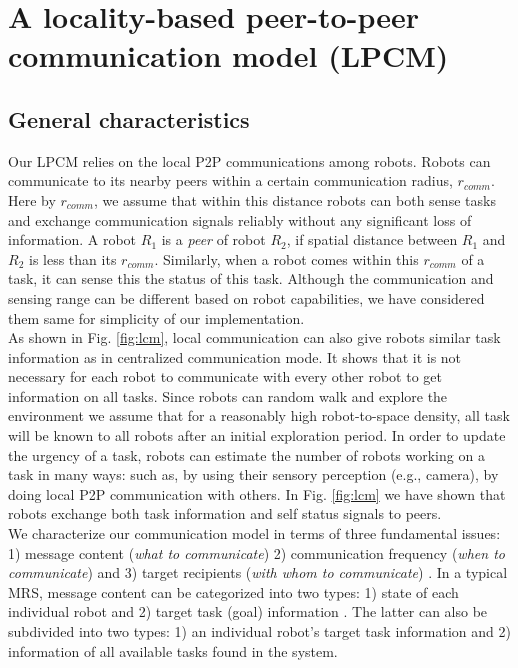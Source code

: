 \section{A locality-based peer-to-peer communication model (LPCM)}
\label{local-comm:model}
\subsection{General characteristics}
Our LPCM relies on the local P2P communications among robots. Robots can communicate to its nearby peers within a certain communication radius, $r_{comm}$. Here by $r_{comm}$, we assume that within this distance robots can both sense tasks and exchange communication signals reliably without any significant loss of information. A robot $R_1$ is a {\em peer} of robot $R_2$, if spatial distance between $R_1$ and $R_2$ is less than its $r_{comm}$.
Similarly, when a robot comes within this $r_{comm}$ of a task, it can sense this the status of this task. Although the communication and sensing  range can be different based on robot capabilities, we have considered them same for simplicity of our implementation.\\
As shown in Fig. \ref{fig:lcm}, local communication can also give robots similar task information as in centralized communication mode. It shows that it is not necessary for each robot to communicate with every other robot to get information on all tasks. Since robots can random walk and explore the environment we assume that for a reasonably high robot-to-space density, all task will be known to all robots after an initial exploration period. In order to update the urgency of a task, robots can estimate the number of robots working on a task in many ways: such as, by using their sensory perception (e.g., camera), by doing local P2P communication with others. In Fig. \ref{fig:lcm} we have shown that robots exchange both task information and self status signals to peers.\\
We characterize our communication model in terms of three fundamental issues: 1) message content ({\em what to communicate}) 2) communication frequency ({\em when to communicate}) and 3) target recipients ({\em with whom to communicate}) \cite{Gerkey}. In a typical MRS, message content can be categorized into two types: 1) state of each individual robot and 2) target task (goal) information \cite{Balch}. The latter can also be subdivided into two types: 1) an individual robot's target task information and 2) information of all available tasks found in the system.\\ 
